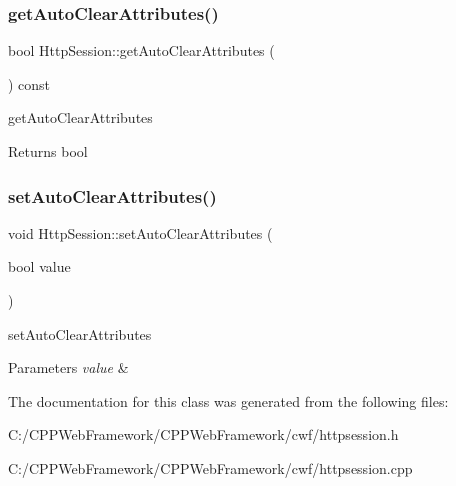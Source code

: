 \subsubsection{\texorpdfstring{get\+Auto\+Clear\+Attributes()}{getAutoClearAttributes()}}
{\footnotesize\ttfamily bool Http\+Session\+::get\+Auto\+Clear\+Attributes (\begin{DoxyParamCaption}{ }\end{DoxyParamCaption}) const}



get\+Auto\+Clear\+Attributes 

\begin{DoxyReturn}{Returns}
bool 
\end{DoxyReturn}
\mbox{\label{class_http_session_a6ba761b5e4935168f867b3e4953a4179}} 
\subsubsection{\texorpdfstring{set\+Auto\+Clear\+Attributes()}{setAutoClearAttributes()}}
{\footnotesize\ttfamily void Http\+Session\+::set\+Auto\+Clear\+Attributes (\begin{DoxyParamCaption}\item[{bool}]{value }\end{DoxyParamCaption})}



set\+Auto\+Clear\+Attributes 


\begin{DoxyParams}{Parameters}
{\em value} & \\
\hline
\end{DoxyParams}


The documentation for this class was generated from the following files\+:\begin{DoxyCompactItemize}
\item 
C\+:/\+C\+P\+P\+Web\+Framework/\+C\+P\+P\+Web\+Framework/cwf/httpsession.\+h\item 
C\+:/\+C\+P\+P\+Web\+Framework/\+C\+P\+P\+Web\+Framework/cwf/httpsession.\+cpp\end{DoxyCompactItemize}
